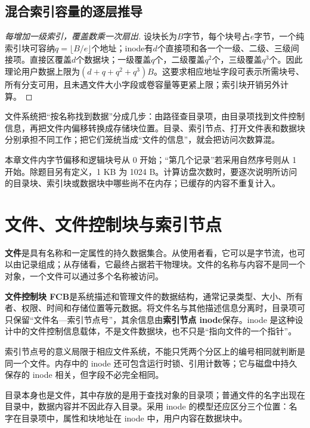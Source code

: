 \subsection{混合索引容量的逐层推导}\label{OS04-capacity-proof}

\begin{proof}[每增加一级索引，覆盖数乘一次扇出]

设块长为\(B\)字节，每个块号占\(e\)字节，一个纯索引块可容纳\(q=\lfloor B/e\rfloor\)个地址；inode有\(d\)个直接项和各一个一级、二级、三级间接项。直接区覆盖\(d\)个数据块；一级覆盖\(q\)个，二级覆盖\(q^2\)个，三级覆盖\(q^3\)个。因此理论用户数据上限为\((d+q+q^2+q^3)B\)。这要求相应地址字段可表示所需块号、所有分支可用，且未遇文件大小字段或卷容量等更紧上限；索引块开销另外计算。

\end{proof}

文件系统把``按名称找到数据''分成几步：由路径查目录项，由目录项找到文件控制信息，再把文件内偏移转换成存储块位置。目录、索引节点、打开文件表和数据块分别承担不同工作；把它们笼统当成``文件的信息''，就会把访问次数算混。

本章文件内字节偏移和逻辑块号从 0 开始；``第几个记录''若采用自然序号则从 1 开始。除题目另有定义，1 KB 为 1024 B。计算访盘次数时，要逐次说明所访问的目录块、索引块或数据块中哪些尚不在内存；已缓存的内容不重复计入。

\section{文件、文件控制块与索引节点}\label{OS04-6-1}

\textbf{文件}是具有名称和一定属性的持久数据集合。从使用者看，它可以是字节流，也可以由记录组成；从存储看，它最终占据若干物理块。文件的名称与内容不是同一个对象，一个文件可以通过多个名称被访问。

\textbf{文件控制块 FCB}是系统描述和管理文件的数据结构，通常记录类型、大小、所有者、权限、时间和存储位置等元数据。将文件名与其他描述信息分离时，目录项可只保留``文件名---索引节点号''，其余信息由\textbf{索引节点 inode}保存。inode 是这种设计中的文件控制信息载体，不是文件数据块，也不只是``指向文件的一个指针''。

索引节点号的意义局限于相应文件系统，不能只凭两个分区上的编号相同就判断是同一个文件。内存中的 inode 还可包含运行时锁、引用计数等；它与磁盘中持久保存的 inode 相关，但字段不必完全相同。

目录本身也是文件，其中存放的是用于查找对象的目录项；普通文件的名字出现在目录中，数据内容并不因此存入目录。采用 inode 的模型还应区分三个位置：名字在目录项中，属性和块地址在 inode 中，用户内容在数据块中。

